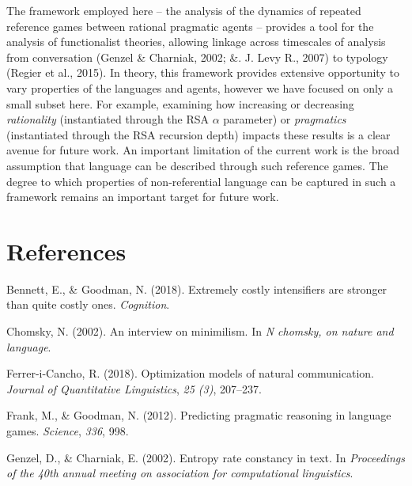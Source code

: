 \documentclass[10pt, letterpaper]{article}
\begin{document}
The framework employed here -- the analysis of the dynamics of repeated
reference games between rational pragmatic agents -- provides a tool for
the analysis of functionalist theories, allowing linkage across
timescales of analysis from conversation (Genzel \& Charniak, 2002; \&.
J. Levy R., 2007) to typology (Regier et al., 2015). In theory, this
framework provides extensive opportunity to vary properties of the
languages and agents, however we have focused on only a small subset
here. For example, examining how increasing or decreasing
\textit{rationality} (instantiated through the RSA \(\alpha\) parameter)
or \textit{pragmatics} (instantiated through the RSA recursion depth)
impacts these results is a clear avenue for future work. An important
limitation of the current work is the broad assumption that language can
be described through such reference games. The degree to which
properties of non-referential language can be captured in such a
framework remains an important target for future work.

\vspace{1em}

\vspace{1em} \noindent

\section{References}\label{references}

\setlength{\parindent}{-0.1in} \setlength{\leftskip}{0.125in} \noindent

\hypertarget{refs}{}
\hypertarget{ref-BennettGoodman2015a}{}
Bennett, E., \& Goodman, N. (2018). Extremely costly intensifiers are
stronger than quite costly ones. \emph{Cognition}.

\hypertarget{ref-Chomsky2002a}{}
Chomsky, N. (2002). An interview on minimilism. In \emph{N chomsky, on
nature and language}.

\hypertarget{ref-FerreriCancho2018a}{}
Ferrer-i-Cancho, R. (2018). Optimization models of natural
communication. \emph{Journal of Quantitative Linguistics}, \emph{25
(3)}, 207--237.

\hypertarget{ref-FrankGoodman2012a}{}
Frank, M., \& Goodman, N. (2012). Predicting pragmatic reasoning in
language games. \emph{Science}, \emph{336}, 998.

\hypertarget{ref-GenzelCharniak2002a}{}
Genzel, D., \& Charniak, E. (2002). Entropy rate constancy in text. In
\emph{Proceedings of the 40th annual meeting on association for
computational linguistics}.
\end{document}
